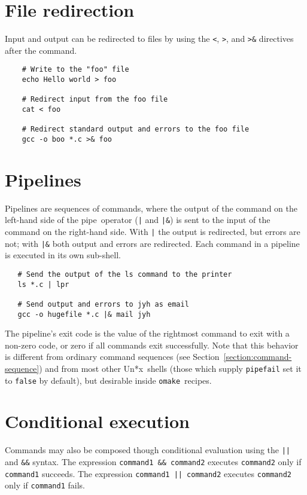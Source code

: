 \section{File redirection}

Input and output can be redirected to files by using the \verb+<+, \verb+>+, and \verb+>&+
directives after the command.

\begin{verbatim}
    # Write to the "foo" file
    echo Hello world > foo

    # Redirect input from the foo file
    cat < foo

    # Redirect standard output and errors to the foo file
    gcc -o boo *.c >& foo
\end{verbatim}

\section{Pipelines}

Pipelines are sequences of commands, where the output of the command on the left-hand side of the
pipe~operator (\verb+|+ and \verb+|&+) is sent to the input of the command on the right-hand side.
With \verb+|+ the output is redirected, but errors are not; with \verb+|&+ both output and errors
are redirected.  Each command in a pipeline is executed in its own sub-shell.

\begin{verbatim}
   # Send the output of the ls command to the printer
   ls *.c | lpr

   # Send output and errors to jyh as email
   gcc -o hugefile *.c |& mail jyh
\end{verbatim}

The pipeline's exit code is the value of the rightmost command to exit with a non-zero code, or zero
if all commands exit successfully.  Note that this behavior is different from ordinary command
sequences (see Section~\ref{section:command-sequence}) and from most other Un*x~shells (those which
supply \verb+pipefail+ set it to \verb+false+ by default), but desirable inside
\verb+omake+~recipes.

\section{Conditional execution}

Commands may also be composed though conditional evaluation using the \verb+||+ and \verb+&&+
syntax.  The expression \verb+command1 && command2+ executes \verb+command2+ only if \verb+command1+
succeeds.  The expression \verb+command1 || command2+ executes \verb+command2+ only if
\verb+command1+ fails.

